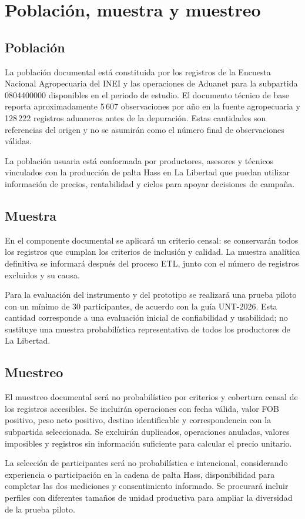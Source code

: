 \section{Población, muestra y muestreo}

\subsection{Población}

La población documental está constituida por los registros de la Encuesta Nacional Agropecuaria del INEI y las operaciones de Aduanet para la subpartida 0804400000 disponibles en el periodo de estudio. El documento técnico de base reporta aproximadamente 5\,607 observaciones por año en la fuente agropecuaria y 128\,222 registros aduaneros antes de la depuración. Estas cantidades son referencias del origen y no se asumirán como el número final de observaciones válidas.

La población usuaria está conformada por productores, asesores y técnicos vinculados con la producción de palta Hass en La Libertad que puedan utilizar información de precios, rentabilidad y ciclos para apoyar decisiones de campaña.

\subsection{Muestra}

En el componente documental se aplicará un criterio censal: se conservarán todos los registros que cumplan los criterios de inclusión y calidad. La muestra analítica definitiva se informará después del proceso ETL, junto con el número de registros excluidos y su causa.

Para la evaluación del instrumento y del prototipo se realizará una prueba piloto con un mínimo de 30 participantes, de acuerdo con la guía UNT-2026. Esta cantidad corresponde a una evaluación inicial de confiabilidad y usabilidad; no sustituye una muestra probabilística representativa de todos los productores de La Libertad.

\subsection{Muestreo}

El muestreo documental será no probabilístico por criterios y cobertura censal de los registros accesibles. Se incluirán operaciones con fecha válida, valor FOB positivo, peso neto positivo, destino identificable y correspondencia con la subpartida seleccionada. Se excluirán duplicados, operaciones anuladas, valores imposibles y registros sin información suficiente para calcular el precio unitario.

La selección de participantes será no probabilística e intencional, considerando experiencia o participación en la cadena de palta Hass, disponibilidad para completar las dos mediciones y consentimiento informado. Se procurará incluir perfiles con diferentes tamaños de unidad productiva para ampliar la diversidad de la prueba piloto.
